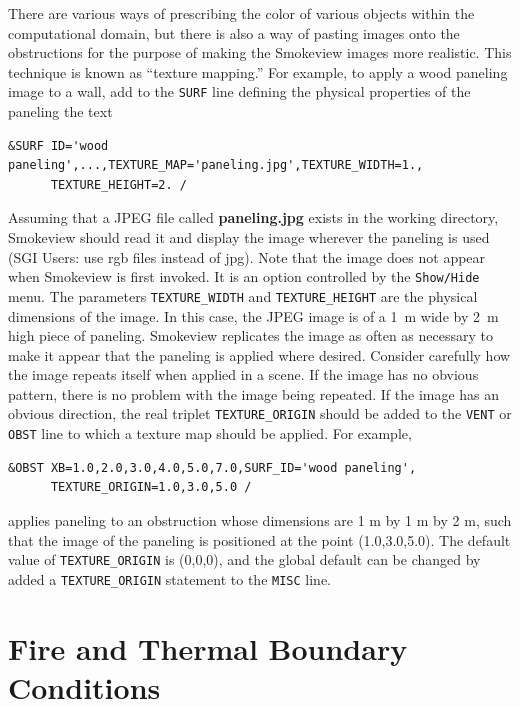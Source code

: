 \documentclass[11pt]{book}
\newcommand{\ct}{\tt\small}
\begin{document}
There are various ways of prescribing the color of various objects
within the computational domain, but there is also a way of pasting
images onto the obstructions for the purpose of making the Smokeview
images more realistic. This technique is known as ``texture mapping.''
For example, to apply a wood paneling image to a wall,
add to the {\ct SURF} line defining the physical properties of the
paneling the text

\footnotesize
\begin{verbatim}
&SURF ID='wood paneling',...,TEXTURE_MAP='paneling.jpg',TEXTURE_WIDTH=1.,
      TEXTURE_HEIGHT=2. /
\end{verbatim}
\normalsize
Assuming that a JPEG file called {\bf paneling.jpg} exists in the
working directory, Smokeview should read it and display the image
wherever the paneling is used (SGI Users: use rgb files instead of jpg).
Note that the image does not appear when Smokeview is first invoked. It is an option controlled by
the {\ct Show/Hide} menu. The parameters {\ct TEXTURE\_WIDTH}
and {\ct TEXTURE\_HEIGHT} are the physical dimensions of the image. In this case,
the JPEG image is of a 1~m wide by 2~m high piece of
paneling. Smokeview replicates the image as often as necessary to
make it appear that the paneling is applied where desired.
Consider carefully how the image repeats itself when
applied in a scene. If the image has no obvious pattern, there is no
problem with the image being repeated. If the image has an obvious
direction, the real triplet {\ct TEXTURE\_ORIGIN} should be added to
the {\ct VENT} or {\ct OBST} line to which a texture map
should be applied. For example,

\footnotesize
\begin{verbatim}
&OBST XB=1.0,2.0,3.0,4.0,5.0,7.0,SURF_ID='wood paneling',
      TEXTURE_ORIGIN=1.0,3.0,5.0 /
\end{verbatim}
\normalsize
applies paneling to an obstruction whose dimensions are 1 m by
1 m by 2 m, such that the image of the paneling is positioned
at the point (1.0,3.0,5.0). The default value of {\ct TEXTURE\_ORIGIN}
is (0,0,0), and the global default can be changed by added a
{\ct TEXTURE\_ORIGIN} statement to the {\ct MISC} line.






\chapter{Fire and Thermal Boundary Conditions}
\end{document}
